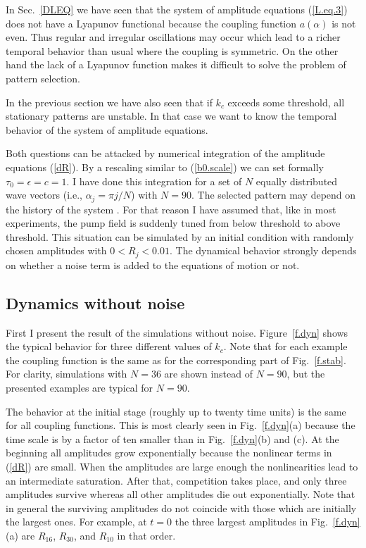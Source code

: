 In Sec.~\ref{DLEQ} we have seen that the system of amplitude
equations (\ref{L.eq.3}) does not have a Lyapunov functional because 
the coupling function $a(\alpha)$ is not even. Thus regular and
irregular oscillations may occur which lead to a richer temporal
behavior than usual where the coupling is symmetric. On the other
hand the lack of a Lyapunov function makes it difficult to solve the
problem of pattern selection. 

In the previous section we have also seen that if $k_c$ exceeds some
threshold, all stationary patterns are unstable. In that case we want
to know the temporal behavior of the system of amplitude equations.

Both questions can be attacked by numerical integration of the
amplitude equations (\ref{dR}). By a rescaling similar to
(\ref{b0.scale}) we can set formally $\tau_0=\epsilon=c=1$. I have
done this integration for a set of $N$ equally distributed wave
vectors (i.e., $\alpha_j=\pi j/N$) with $N=90$. The selected pattern
may depend on the history of the system \cite{cro.93}. For that
reason I have assumed that, like in most experiments, the pump field
is suddenly tuned from below threshold to above threshold. This
situation can be simulated by an initial condition with randomly
chosen amplitudes with $0<R_j<0.01$. The dynamical behavior strongly
depends on whether a noise term is added to the equations of motion
or not.

\subsection{\protect\label{WNOIS}Dynamics without noise}

First I present the result of the simulations without noise.
Figure~\ref{f.dyn} shows the typical behavior for three different
values of $k_c$. Note that for each example the coupling function is
the same as for the corresponding part of Fig.~\ref{f.stab}. For
clarity, simulations with $N=36$ are shown instead of $N=90$, but the
presented examples are typical for $N=90$.

The behavior at the initial stage (roughly up to twenty time units)
is the same for all coupling functions. This is most clearly seen in
Fig.~\ref{f.dyn}(a) because the time scale is by a factor of ten
smaller than in Fig.~\ref{f.dyn}(b) and (c).  At the beginning all
amplitudes grow exponentially because the nonlinear terms in
(\ref{dR}) are small. When the amplitudes are large enough the
nonlinearities lead to an intermediate saturation. After that,
competition takes place, and only three amplitudes survive whereas
all other amplitudes die out exponentially. Note that in general the
surviving amplitudes do not coincide with those which are initially
the largest ones.  For example, at $t=0$ the three largest amplitudes
in Fig.~\ref{f.dyn}(a) are $R_{16}$, $R_{30}$, and $R_{10}$ in that
order. 

